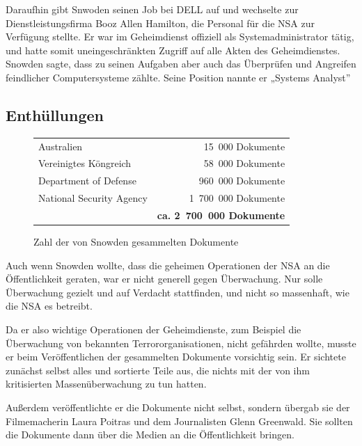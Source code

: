 \documentclass[12pt,a4paper]{scrartcl}
\begin{document}
Daraufhin gibt Snwoden seinen Job bei DELL auf und wechselte zur Dienstleistungsfirma Booz Allen Hamilton, die Personal für die NSA zur Verfügung stellte. Er war im Geheimdienst offiziell als Systemadministrator tätig, und hatte somit uneingeschränkten Zugriff auf alle Akten des Geheimdienstes. Snowden sagte, dass zu seinen Aufgaben aber auch das Überprüfen und Angreifen feindlicher Computersysteme zählte. Seine Position nannte er „Systems Analyst”

\subsection{Enthüllungen}

\begin{figure}[H]
\centering
\begin{tabular}{lr}
Australien & 15~000 Dokumente \\
Vereinigtes Köngreich & 58~000 Dokumente \\
Department of Defense & 960~000 Dokumente \\
National Security Agency & 1~700~000 Dokumente \\
& \textbf{ca. 2~700~000 Dokumente}
\end{tabular}
\caption{Zahl der von Snowden gesammelten Dokumente \cite{wiki_snowden}}
\end{figure}

Auch wenn Snowden wollte, dass die geheimen Operationen der NSA an die Öffentlichkeit geraten, war er nicht generell gegen Überwachung. Nur solle Überwachung gezielt und auf Verdacht stattfinden, und nicht so massenhaft, wie die NSA es betreibt. 

Da er also wichtige Operationen der Geheimdienste, zum Beispiel die Überwachung von bekannten Terrororganisationen, nicht gefährden wollte, musste er beim Veröffentlichen der gesammelten Dokumente vorsichtig sein. Er sichtete zunächst selbst alles und sortierte Teile aus, die nichts mit der von ihm kritisierten Massenüberwachung zu tun hatten.

Außerdem veröffentlichte er die Dokumente nicht selbst, sondern übergab sie der Filmemacherin Laura Poitras und dem Journalisten Glenn Greenwald. Sie sollten die Dokumente dann über die Medien an die Öffentlichkeit bringen.
\end{document}
